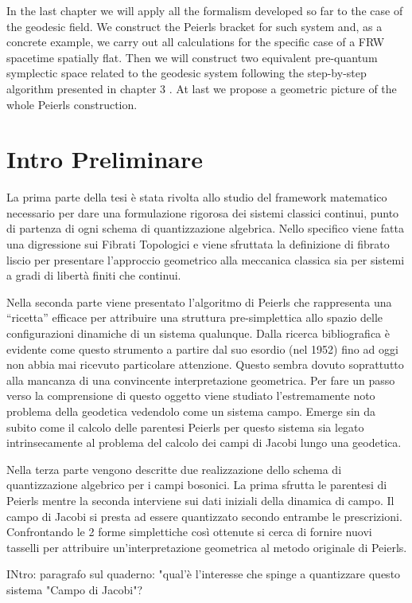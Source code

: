 \documentclass[Main]{subfiles}
\begin{document}
In the last chapter we will apply all the formalism developed so far to the case of the geodesic field.
We construct the Peierls bracket for such system and, as a  concrete example, we carry out all calculations for the specific case of a FRW spacetime spatially flat.
Then we will construct two equivalent pre-quantum symplectic space related to the geodesic system following the step-by-step algorithm presented in chapter 3 .
At last we propose a geometric picture of the whole Peierls construction.


\ifToninus
\section{Intro Preliminare}
La prima parte della tesi è stata rivolta allo studio del framework matematico necessario per dare una formulazione rigorosa dei sistemi classici continui, punto di partenza di ogni schema di quantizzazione algebrica.
Nello specifico viene fatta una digressione sui Fibrati Topologici e viene sfruttata la definizione di fibrato liscio per presentare l'approccio geometrico alla meccanica classica sia per sistemi a gradi di libertà finiti che continui.

Nella seconda parte viene presentato l'algoritmo di Peierls che rappresenta una “ricetta” efficace per attribuire una struttura pre-simplettica allo spazio delle configurazioni dinamiche di un sistema qualunque.
Dalla ricerca bibliografica è evidente come questo strumento a partire dal suo esordio (nel 1952) fino ad oggi non abbia mai ricevuto particolare attenzione. Questo sembra dovuto soprattutto alla mancanza di una convincente interpretazione geometrica.
\newline
Per fare un passo verso la comprensione di questo oggetto viene studiato l’estremamente noto problema della geodetica vedendolo come un sistema campo.
Emerge sin da subito come il calcolo delle parentesi Peierls per questo sistema sia legato intrinsecamente al problema del calcolo dei campi di Jacobi lungo una geodetica.

Nella terza parte vengono descritte due  realizzazione dello schema di quantizzazione algebrico per i campi bosonici. La prima sfrutta le parentesi di Peierls mentre la seconda interviene sui dati iniziali della dinamica di campo.
\newline
Il campo di Jacobi si presta ad essere quantizzato secondo entrambe le prescrizioni.
Confrontando le 2 forme simplettiche così ottenute si cerca di fornire nuovi tasselli per attribuire un'interpretazione geometrica al metodo originale di Peierls.


	\begin{Warning}
	INtro: paragrafo sul quaderno: "qual'è l'interesse che spinge a quantizzare questo sistema "Campo di Jacobi"?
	\end{Warning}
\fi
\end{document}
